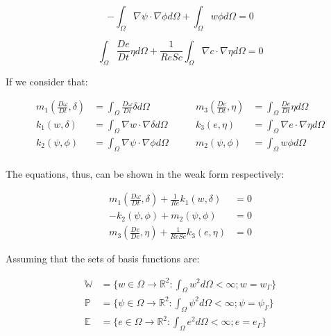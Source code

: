 \begin{equation} \label{stream weak}
 - \int_{\Omega} \nabla \psi \cdot \nabla \phi d\Omega
 + \int_{\Omega} w \phi d\Omega = 0
\end{equation}

\begin{equation} \label{concentration weak} 
   \int_{\Omega} \frac{D e}{Dt} \eta d\Omega
 + \frac{1}{\textit{ReSc}} \int_{\Omega} \nabla c \cdot \nabla \eta d\Omega 
 = 0
\end{equation}


\medskip
\noindent
If we consider that:

\begin{equation}
 \begin{aligned}
  \textbf{$m_1$}(\frac{D \omega}{Dt},\delta) & = \int_{\Omega} \frac{D \omega}{Dt} \delta d\Omega \\ 
  \textbf{$k_1$}(w,\delta) & = \int_{\Omega} \nabla w \cdot \nabla \delta d\Omega \\
  \textbf{$k_2$}(\psi,\phi) & = \int_{\Omega} \nabla \psi \cdot \nabla \phi d\Omega \\
 \end{aligned}
 \qquad
 \begin{aligned}  
  \textbf{$m_3$}(\frac{De}{Dt},\eta) & = \int_{\Omega} \frac{De}{Dt} \eta d\Omega \\
  \textbf{$k_3$}(e,\eta) & = \int_{\Omega} \nabla e \cdot \nabla \eta d\Omega \\
  \textbf{$m_2$}(\psi,\phi) & = \int_{\Omega} w \phi d\Omega \\
 \end{aligned}
\end{equation}

\noindent
The equations, thus, can be shown in the weak form respectively:

\begin{align}
 \textbf{$m_1$}(\frac{D \omega}{Dt},\delta) 
 + \frac{1}{\textit{Re}}\textbf{$k_1$}(w,\delta) 
 & = 0 \\
 - \textbf{$k_2$}(\psi,\phi) 
 + \textbf{$m_2$}(\psi,\phi) 
 & = 0 \\
 \textbf{$m_3$}(\frac{De}{De},\eta) 
 + \frac{1}{\textit{ReSc}}\textbf{$k_3$}(e,\eta) 
 & = 0
\end{align}


\noindent
Assuming that the sets of basis functions are:

\begin{equation}
 \begin{aligned}
  \mathbb{W} &= \{w \in \Omega \rightarrow \mathbb{R}^2
  : \int_\Omega w^2 d\Omega < \infty 
  ; w = w_\Gamma\} \\
  \mathbb{P} &= \{\psi \in \Omega \rightarrow \mathbb{R}^2
  : \int_\Omega \psi^2 d\Omega < \infty 
  ; \psi = \psi_\Gamma\} \\
  \mathbb{E} &= \{e \in \Omega \rightarrow \mathbb{R}^2
  : \int_\Omega e^2 d\Omega < \infty 
  ; e = e_\Gamma\}
 \end{aligned}
\end{equation}

